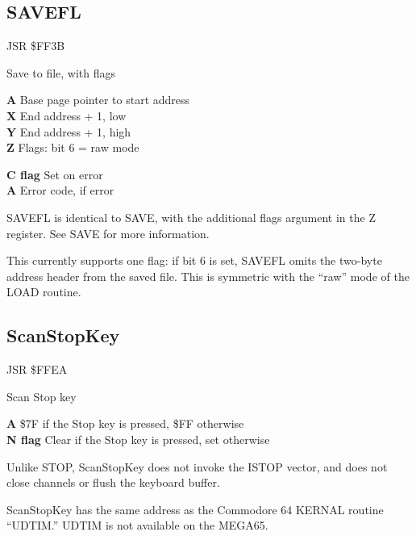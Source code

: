 \subsection{SAVEFL}
\label{KERNAL Jump Table!SAVEFL}
\begin{description}[leftmargin=2cm,style=nextline]
    \item [Address:] JSR \$FF3B
    \item [Description:] Save to file, with flags
    \item [Inputs:]
        \textbf{A} Base page pointer to start address \\
        \textbf{X} End address + 1, low \\
        \textbf{Y} End address + 1, high \\
        \textbf{Z} Flags: bit 6 = raw mode
    \item [Outputs:]
        \textbf{C flag} Set on error \\
        \textbf{A} Error code, if error
    \item [Remarks:]
        SAVEFL is identical to SAVE, with the additional flags argument in the Z register. See SAVE for more information.

        This currently supports one flag: if bit 6 is set, SAVEFL omits the two-byte address header from the saved file. This is symmetric with the ``raw'' mode of the LOAD routine.
\end{description}



\newpage
\subsection{ScanStopKey}
\label{KERNAL Jump Table!ScanStopKey}
\begin{description}[leftmargin=2cm,style=nextline]
    \item [Address:] JSR \$FFEA
    \item [Description:] Scan Stop key
    \item [Outputs:]
        \textbf{A} \$7F if the Stop key is pressed, \$FF otherwise \\
        \textbf{N flag} Clear if the Stop key is pressed, set otherwise
    \item [Remarks:]
        Unlike STOP, ScanStopKey does not invoke the ISTOP vector, and does not close channels or flush the keyboard buffer.

        ScanStopKey has the same address as the Commodore 64 KERNAL routine ``UDTIM.'' UDTIM is not available on the MEGA65.
    \item [Example:]
\end{description}


